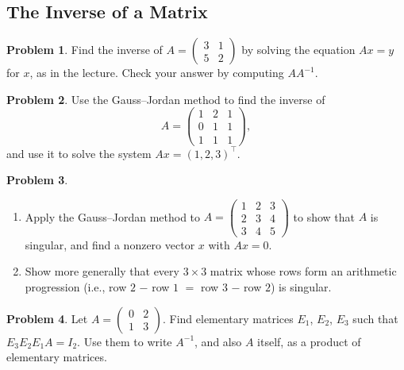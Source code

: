 \documentclass[11pt]{article}
\theoremstyle{definition}
\newtheorem{problem}{Problem}[section]
\begin{document}
\subsection{The Inverse of a Matrix}

\begin{problem}\label{pr:inverse2}
    Find the inverse of $A = \begin{pmatrix} 3 & 1 \\ 5 & 2 \end{pmatrix}$ by solving the equation $Ax = y$ for $x$, as in the lecture. Check your answer by computing $AA^{-1}$.
\end{problem}

\begin{problem}\label{pr:inverse3}
    Use the Gauss--Jordan method to find the inverse of
    \[A = \begin{pmatrix} 1 & 2 & 1 \\ 0 & 1 & 1 \\ 1 & 1 & 1 \end{pmatrix},\]
    and use it to solve the system $Ax = (1, 2, 3)^\top$.
\end{problem}

\begin{problem}\label{pr:arithmetic}
    \begin{enumerate}[label=(\alph*)]
        \item Apply the Gauss--Jordan method to $A = \begin{pmatrix} 1 & 2 & 3 \\ 2 & 3 & 4 \\ 3 & 4 & 5 \end{pmatrix}$ to show that $A$ is singular, and find a nonzero vector $x$ with $Ax = 0$.
        \item Show more generally that every $3 \times 3$ matrix whose rows form an arithmetic progression (i.e., row $2$ $-$ row $1$ $=$ row $3$ $-$ row $2$) is singular.
    \end{enumerate}
\end{problem}

\begin{problem}\label{pr:elementary}
    Let $A = \begin{pmatrix} 0 & 2 \\ 1 & 3 \end{pmatrix}$. Find elementary matrices $E_1$, $E_2$, $E_3$ such that $E_3 E_2 E_1 A = I_2$. Use them to write $A^{-1}$, and also $A$ itself, as a product of elementary matrices.
\end{problem}
\end{document}
